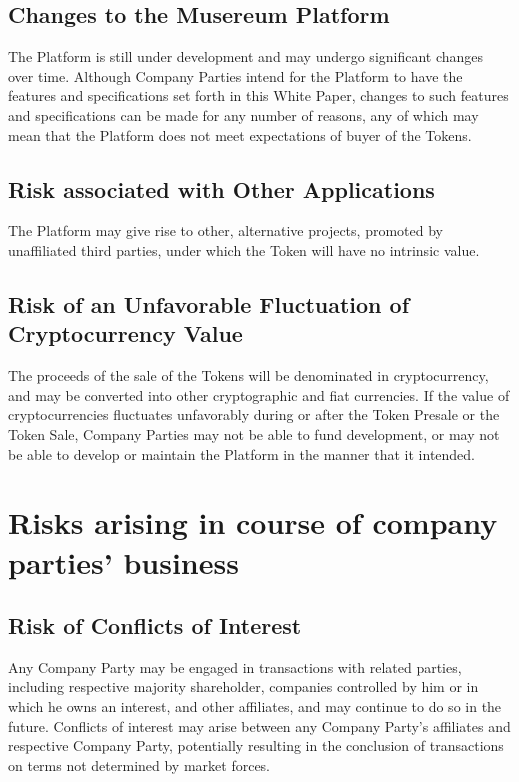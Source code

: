 \documentclass[12pt]{report}
\begin{document}
\subsection{Changes to the Musereum Platform}
The Platform is still under development and may undergo significant changes over time. Although Company Parties intend for the Platform to have the features and specifications set forth in this White Paper, changes to such features and specifications can be made for any number of reasons, any of which may mean that the Platform does not meet expectations of buyer of the Tokens.

\subsection{Risk associated with Other Applications}
The Platform may give rise to other, alternative projects, promoted by unaffiliated third parties, under which the Token will have no intrinsic value.

\subsection{Risk of an Unfavorable Fluctuation of Cryptocurrency Value}
The proceeds of the sale of the Tokens will be denominated in cryptocurrency, and may be converted into other cryptographic and fiat currencies. If the value of cryptocurrencies fluctuates unfavorably during or after the Token Presale or the Token Sale, Company Parties may not be able to fund development, or may not be able to develop or maintain the Platform in the manner that it intended.

\section{Risks arising in course of company parties' business}
\subsection{Risk of Conflicts of Interest}
Any Company Party may be engaged in transactions with related parties, including respective majority shareholder, companies controlled by him or in which he owns an interest, and other affiliates, and may continue to do so in the future. Conflicts of interest may arise between any Company Party’s affiliates and respective Company Party, potentially resulting in the conclusion of transactions on terms not determined by market forces.
\end{document}

